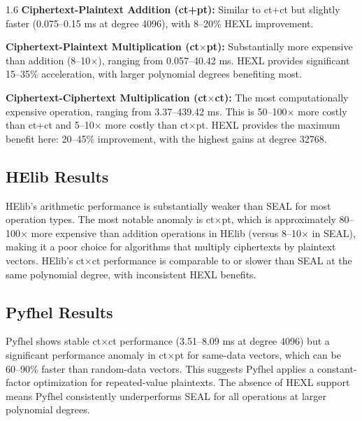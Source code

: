\begin{spacing}{1.6}
\textbf{Ciphertext-Plaintext Addition (ct+pt):} Similar to ct+ct but slightly
faster (0.075--0.15 ms at degree 4096), with 8--20\% HEXL improvement.

\textbf{Ciphertext-Plaintext Multiplication (ct$\times$pt):}
Substantially more expensive than addition (8--10$\times$), ranging from
0.057--40.42 ms. HEXL provides significant 15--35\% acceleration, with
larger polynomial degrees benefiting most.

\textbf{Ciphertext-Ciphertext Multiplication (ct$\times$ct):}
The most computationally expensive operation, ranging from 3.37--439.42 ms.
This is 50--100$\times$ more costly than ct+ct and 5--10$\times$ more costly
than ct$\times$pt. HEXL provides the maximum benefit here: 20--45\%
improvement, with the highest gains at degree 32768.

\subsection{HElib Results}

HElib's arithmetic performance is substantially weaker than SEAL for most
operation types. The most notable anomaly is ct$\times$pt, which is
approximately 80--100$\times$ more expensive than addition operations in
HElib (versus 8--10$\times$ in SEAL), making it a poor choice for algorithms
that multiply ciphertexts by plaintext vectors. HElib's ct$\times$ct
performance is comparable to or slower than SEAL at the same polynomial degree,
with inconsistent HEXL benefits.

\subsection{Pyfhel Results}

Pyfhel shows stable ct$\times$ct performance (3.51--8.09 ms at degree 4096)
but a significant performance anomaly in ct$\times$pt for same-data vectors,
which can be 60--90\% faster than random-data vectors. This suggests Pyfhel
applies a constant-factor optimization for repeated-value plaintexts. The
absence of HEXL support means Pyfhel consistently underperforms SEAL for all
operations at larger polynomial degrees.


\end{spacing}
